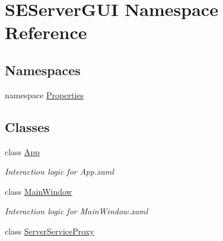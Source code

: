 \hypertarget{namespace_s_e_server_g_u_i}{}\section{S\+E\+Server\+G\+U\+I Namespace Reference}
\label{namespace_s_e_server_g_u_i}
\subsection*{Namespaces}
\begin{DoxyCompactItemize}
\item 
namespace \hyperlink{namespace_s_e_server_g_u_i_1_1_properties}{Properties}
\end{DoxyCompactItemize}
\subsection*{Classes}
\begin{DoxyCompactItemize}
\item 
class \hyperlink{class_s_e_server_g_u_i_1_1_app}{App}
\begin{DoxyCompactList}\small\item\em Interaction logic for App.\+xaml \end{DoxyCompactList}\item 
class \hyperlink{class_s_e_server_g_u_i_1_1_main_window}{Main\+Window}
\begin{DoxyCompactList}\small\item\em Interaction logic for Main\+Window.\+xaml \end{DoxyCompactList}\item 
class \hyperlink{class_s_e_server_g_u_i_1_1_server_service_proxy}{Server\+Service\+Proxy}
\end{DoxyCompactItemize}
